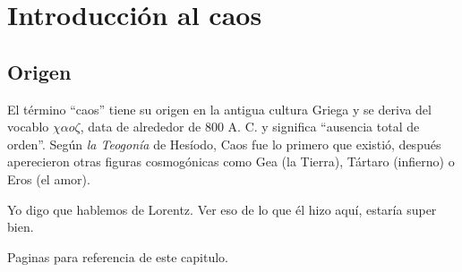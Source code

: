 \chapter{Introducción al caos}
\section{Origen}

El término ``caos'' tiene su origen en la antigua cultura Griega y se deriva del vocablo $\chi \alpha o \zeta$, data de alrededor de 800 A. C. y significa ``ausencia total de orden''. Según \textit{la Teogonía} de Hesíodo, Caos fue lo primero que existió, después aperecieron otras figuras cosmogónicas como Gea (la Tierra), Tártaro (infierno) o Eros (el amor).



Yo digo que hablemos de Lorentz. Ver eso de lo que él hizo aquí, estaría super bien.

 


Paginas para referencia de este capitulo.

